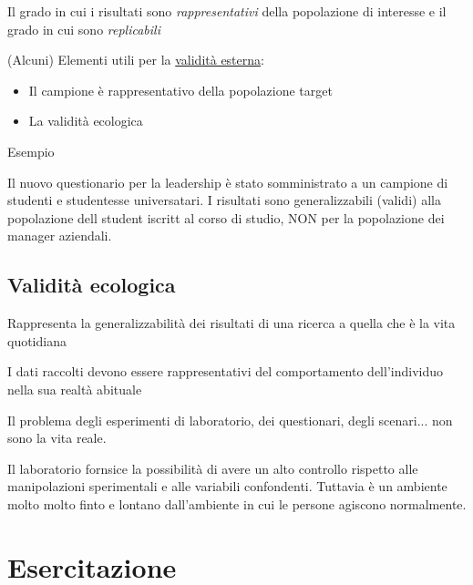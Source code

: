 \documentclass[compress]{beamer}
\begin{document}
\begin{frame}
	Il grado in cui i risultati sono \emph{rappresentativi} della popolazione di interesse e il grado in cui sono \emph{replicabili}
	
	(Alcuni) Elementi utili per la \underline{validità esterna}:
	\begin{itemize}
		\item Il campione è rappresentativo della popolazione target
		\item La validità ecologica
	\end{itemize} 
	
	\begin{block}{Esempio}
		
		Il nuovo questionario per la leadership è stato somministrato a un campione di studenti e studentesse universatari. I risultati sono generalizzabili (validi) alla popolazione dell student iscritt al corso di studio, NON per la popolazione dei manager aziendali.
	\end{block}
\end{frame}

\subsection{Validità ecologica}

\begin{frame}
		Rappresenta la generalizzabilità dei risultati di una ricerca a quella che è la vita quotidiana 

I dati raccolti devono essere rappresentativi del comportamento dell’individuo nella sua realtà abituale

Il problema degli esperimenti di laboratorio, dei questionari, degli scenari... non sono la vita reale.

Il laboratorio fornsice la possibilità di avere un alto controllo rispetto alle manipolazioni sperimentali e alle variabili confondenti. Tuttavia è un ambiente molto molto finto e lontano dall'ambiente in cui le persone agiscono normalmente.
\end{frame}

\section{Esercitazione}
\end{document}
